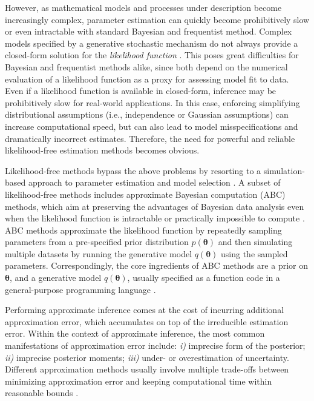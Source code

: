 \documentclass[9pt,twoside,lineno]{pnas-new}
\begin{document}
However, as mathematical models and processes under description become increasingly complex, parameter estimation can quickly become prohibitively slow or even intractable with standard Bayesian and frequentist method. Complex models specified by a generative stochastic mechanism do not always provide a closed-form solution for the \textit{likelihood function} \cite{palestro2018likelihood, csillery2010approximate, toni2009simulation}. This poses great difficulties for Bayesian and frequentist methods alike, since both depend on the numerical evaluation of a likelihood function as a proxy for assessing model fit to data. Even if a likelihood function is available in closed-form, inference may be prohibitively slow for real-world applications. In this case, enforcing simplifying distributional assumptions (i.e., independence or Gaussian assumptions) can increase computational speed, but can also lead to model misspecifications and dramatically incorrect estimates. Therefore, the need for powerful and reliable likelihood-free estimation methods becomes obvious. 

Likelihood-free methods bypass the above problems by resorting to a simulation-based approach to parameter estimation and model selection \cite{palestro2018likelihood, turner2014generalized}. A subset of likelihood-free methods includes approximate Bayesian computation (ABC) methods, which aim at preserving the advantages of Bayesian data analysis even when the likelihood function is intractable or practically impossible to compute \cite{turner2014generalized, sunnaaker2013approximate, csillery2010approximate}. ABC methods approximate the likelihood function by repeatedly sampling parameters from a pre-specified prior distribution $p(\boldsymbol{\theta})$ and then simulating multiple datasets by running the generative model $q(\boldsymbol{\theta})$ using the sampled parameters. Correspondingly, the core ingredients of ABC methods are a prior on $\boldsymbol{\theta}$, and a generative model $q(\boldsymbol{\theta})$, usually specified as a function code in a general-purpose programming language \cite{csillery2010approximate, mertens2018abrox}.

Performing approximate inference comes at the cost of incurring additional approximation error, which accumulates on top of the irreducible estimation error. Within the context of approximate inference, the most common manifestations of approximation error include: \textit{i)} imprecise form of the posterior; \textit{ii)} imprecise posterior moments; \textit{iii)} under- or overestimation of uncertainty. Different approximation methods usually involve multiple trade-offs between minimizing approximation error and keeping computational time within reasonable bounds \cite{frazier2018asymptotic, palestro2018likelihood}.
\end{document}
